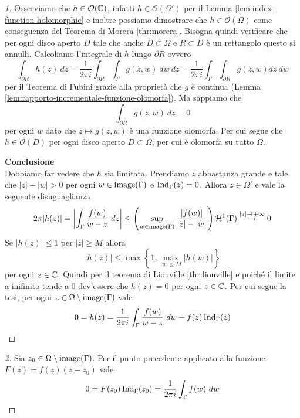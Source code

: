 \begin{proof}[1]
    Osserviamo che $h \in \mathcal{O}(\mathbb{C})$, infatti $h \in
    \mathcal{O}(\Omega')$ per il Lemma \ref{lem:index-function-holomorphic}
    e inoltre possiamo dimostrare che $h \in \mathcal{O}(\Omega)$ come
    conseguenza del Teorema di Morera \ref{thr:morera}. 
    Bisogna quindi verificare che per ogni disco aperto $D$ tale che anche 
    $\overline{D}\subset \Omega$ e $R \subset D$ è un rettangolo questo si
    annulli. Calcoliamo l'integrale di $h$ lungo $\partial R$ ovvero 
    \begin{equation*}
      \int_{\partial R} h(z)\ dz = \frac{1}{2\pi i} \int_{\partial
      R}\int_\Gamma g(z,w)\ dw\ dz = \frac{1}{2\pi i} \int_\Gamma
      \int_{\partial R} g(z,w) dz\ dw
    \end{equation*}
    per il Teorema di Fubini grazie alla proprietà che $g$ è continua (Lemma
    \ref{lem:rapporto-incrementale-funzione-olomorfa}). Ma sappiamo che 
    \begin{equation*}
      \int_{\partial R} g(z,w) \ dz = 0  
    \end{equation*}
    per ogni $w$ dato che $z \mapsto g(z,w)$ è una funzione olomorfa. Per
    cui segue che $h \in \mathcal{O}(D)$ per ogni disco aperto $D \subset
    \Omega$, per cui è olomorfa su tutto $\Omega$.

    \textbf{Conclusione}\\

    Dobbiamo far vedere che $h$ sia limitata. Prendiamo $z$ abbastanza
    grande e tale che $|z| - |w| > 0$ per ogni $w \in \operatorname{image}(\Gamma)$
    e $\operatorname{Ind}_\Gamma(z) = 0$. Allora $z \in \Omega'$ e vale la
    seguente disuguaglianza
    \begin{equation*}
      2\pi |h(z)| = \left|\int_\Gamma \frac{f(w)}{w-z}\ dz \right| \le
      \left( \sup_{w \in \operatorname{image}(\Gamma)} \frac{|f(w)|}{|z|-|w|} \right)
        \mathcal{H}^1(\Gamma) \overset{|z|\to+\infty}{\to} 0
    \end{equation*}
    Se $|h(z)| \le 1$ per $|z| \ge M$ allora 
    \begin{equation*}
      |h(z)| \le \max \left\{1,\max_{|w| \le M} |h(w)|\right\}
    \end{equation*}
    per ogni $z \in \mathbb{C}$. Quindi per il teorema di Liouville
    \ref{thr:liouville} e poiché il limite a inifinito tende a $0$
    dev'essere che $h(z) = 0$ per ogni $z \in \mathbb{C}$. Per cui segue la tesi, 
    per ogni $z \in \Omega \setminus \operatorname{image}(\Gamma)$ vale 
    \begin{equation*}
      0 = h(z) = \frac{1}{2 \pi i} \int_\Gamma \frac{f(w)}{w-z}\ dw - f(z)
      \operatorname{Ind}_\Gamma(z)  
    \end{equation*}
\end{proof}
\begin{proof}[2]
  Sia $z_0 \in \Omega \setminus \operatorname{image}(\Gamma)$. Per il punto precedente
    applicato alla funzione $F(z) = f(z)(z-z_0)$ vale
    \begin{equation*}
      0 = F(z_0)\operatorname{Ind}_\Gamma(z_0) = \frac{1}{2 \pi i}
      \int_\Gamma f(w)\ dw
    \end{equation*}
\end{proof}

